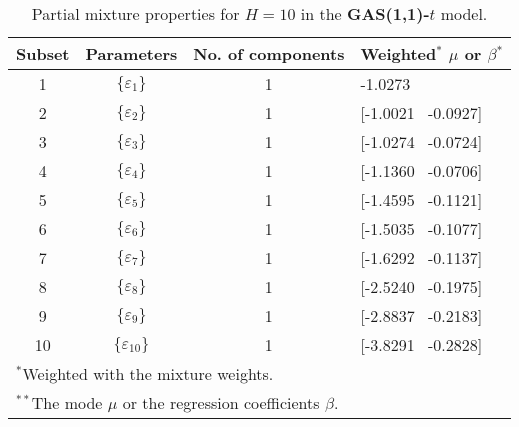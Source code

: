 \footnotesize{  
{ \renewcommand{\arraystretch}{1.3} 
\begin{longtable}{cccp{3.6cm}} 
\caption{Partial mixture properties for $H=10$ in the \textbf{GAS(1,1)-$t$} model.} 
\label{tab:pmits_t_gas_ML} \\ 
 Subset & Parameters & No. of components  & Weighted$^{*}$ $\mu$ or $\beta$$^{*}$ \\ \hline 
1 & $\{\varepsilon_{1}\}$ & 1 & -1.0273   \\ [1ex] 
2 & $\{\varepsilon_{2}\}$ & 1 & [-1.0021 \, -0.0927]   \\ [1ex] 
3 & $\{\varepsilon_{3}\}$ & 1 & [-1.0274 \, -0.0724]   \\ [1ex] 
4 & $\{\varepsilon_{4}\}$ & 1 & [-1.1360 \, -0.0706]   \\ [1ex] 
5 & $\{\varepsilon_{5}\}$ & 1 & [-1.4595 \, -0.1121]   \\ [1ex] 
6 & $\{\varepsilon_{6}\}$ & 1 & [-1.5035 \, -0.1077]   \\ [1ex] 
7 & $\{\varepsilon_{7}\}$ & 1 & [-1.6292 \, -0.1137]   \\ [1ex] 
8 & $\{\varepsilon_{8}\}$ & 1 & [-2.5240 \, -0.1975]   \\ [1ex] 
9 & $\{\varepsilon_{9}\}$ & 1 & [-2.8837 \, -0.2183]   \\ [1ex] 
10 & $\{\varepsilon_{10}\}$ & 1 & [-3.8291 \, -0.2828]   \\ [1ex] 
\hline 
 \multicolumn{4}{l}{\footnotesize{$^{*}$Weighted with the mixture weights.}} \\ 
 \multicolumn{4}{l}{\footnotesize{$^{**}$The mode $\mu$ or the regression coefficients $\beta$.}} \\ 
\end{longtable} 
} 
} 
\normalsize 
